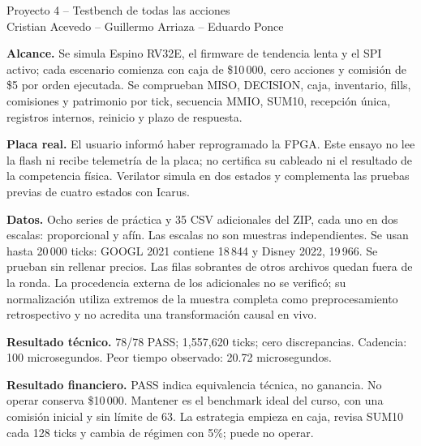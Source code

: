 \documentclass[10pt,a4paper,landscape]{article}
\begin{document}
\begin{center}{\LARGE Proyecto 4 -- Testbench de todas las acciones}\\[5pt]
Cristian Acevedo -- Guillermo Arriaza -- Eduardo Ponce\end{center}
\textbf{Alcance.} Se simula Espino RV32E, el firmware de tendencia lenta y el
SPI activo; cada escenario comienza con caja de \$10\,000, cero acciones y
comisión de \$5 por orden ejecutada. Se comprueban MISO, DECISION, caja,
inventario, fills, comisiones y patrimonio por tick, secuencia MMIO, SUM10,
recepción única, registros internos, reinicio y plazo de respuesta.

\textbf{Placa real.} El usuario informó haber reprogramado la FPGA. Este ensayo
no lee la flash ni recibe telemetría de la placa; no certifica su cableado ni
el resultado de la competencia física. Verilator simula en dos estados y
complementa las pruebas previas de cuatro estados con Icarus.

\textbf{Datos.} Ocho series de práctica y 35 CSV adicionales del ZIP, cada uno
en dos escalas: proporcional y afín. Las escalas no son muestras independientes.
Se usan hasta 20\,000 ticks: GOOGL 2021 contiene 18\,844 y Disney 2022,
19\,966. Se prueban sin rellenar precios. Las filas sobrantes de otros archivos
quedan fuera de la ronda. La procedencia externa de los adicionales no se
verificó; su normalización utiliza extremos de la muestra completa como
preprocesamiento retrospectivo y no acredita una transformación causal en vivo.

\textbf{Resultado técnico.} 78/78 PASS; 1,557,620 ticks; cero discrepancias. Cadencia: 100 microsegundos. Peor tiempo observado: 20.72 microsegundos.

\textbf{Resultado financiero.} PASS indica equivalencia técnica, no ganancia.
No operar conserva \$10\,000. Mantener es el benchmark ideal del curso, con
una comisión inicial y sin límite de 63. La estrategia empieza en caja, revisa
SUM10 cada 128 ticks y cambia de régimen con 5\%; puede no operar.
\end{document}
